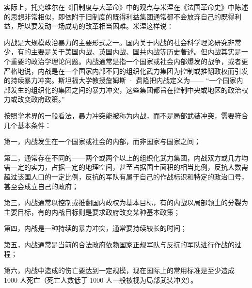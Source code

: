 实际上，托克维尔在《旧制度与大革命》中的观点与米涅在《法国革命史》中陈述的思想非常相似，即依附于旧制度的既得利益集团通常都不会放弃自己的既得利益，所以要发动一场成功的改革相当困难。米涅这样说：



内战是大规模政治暴力的主要形式之一。国内关于内战的社会科学理论研究非常少，有的主要是关于美国内战、英国内战、国共内战等历史著述。但内战其实是一个重要的政治学理论问题。内战通常是指一个国家或社会内部爆发的战争，或者更严格地说，内战是在一个国家内部不同的组织化武力集团为控制或推翻政权而引发的持续暴力冲突。斯坦福大学教授詹姆斯 · 费隆把内战定义为—— “一个国家内部发生的组织化的集团之间的暴力冲突，这些集团都旨在控制中央或地区的政治权力或改变政府政策。” 

按照学术界的一般看法，暴力冲突能被称为内战，而不是局部武装冲突，需要符合几个基本条件：

第一，内战发生在一个国家或社会的内部，而非国家与国家之间；

第二，通常存在不同的——两个或两个以上的组织化武力集团，内战双方或几方均需一定的实力，占据一定的地理空间，甚至占据国土面积的相当比例，反抗人数需超过该国人口的一定比例，反抗的军队有属于自己的作战标识和特定的政治口号，甚至会成立自己的政府；

第三，内战通常以控制或推翻国内政权为基本目标，有的内战以局部领土的分裂为主要目标，有的内战目标则是要求政府改变某种基本政策；

第四，内战是一种持续的暴力冲突，通常要持续较长的时间；

第五，内战通常是当前的合法政府依赖国家正规军队与反抗的军队进行作战的过程；

第六，内战中造成的伤亡要达到一定规模，现在国际上的常用标准是至少造成 1000 人死亡（死亡人数低于 1000 人一般被视为局部武装冲突）。

